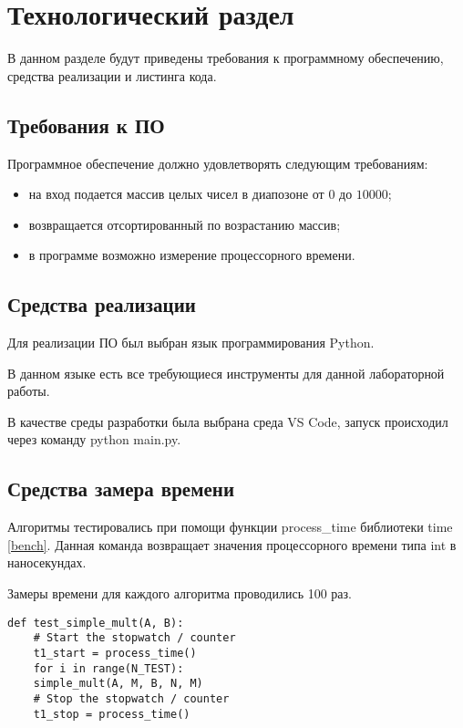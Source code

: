 \chapter{Технологический раздел}

В данном разделе будут приведены требования к программному обеспечению, средства реализации и листинга кода.

\section{Требования к ПО}

Программное обеспечение должно удовлетворять следующим требованиям:
\begin{itemize}
	\item на вход подается массив целых чисел в диапозоне от $0$ до $10000$;
	\item возвращается отсортированный по возрастанию массив;
	\item в программе возможно измерение процессорного времени.
\end{itemize}

\section{Средства реализации} 
Для реализации ПО был выбран язык программирования Python\cite{python}. 

В данном языке есть все требующиеся инструменты для данной лабораторной работы.

В качестве среды разработки была выбрана среда VS Code\cite{vscode}, запуск происходил через команду python main.py.

\section{Средства замера времени}

Алгоритмы тестировались при помощи функции process\_time библиотеки time \ref{bench}. Данная команда возвращает значения процессорного времени типа int в наносекундах.

Замеры времени для каждого алгоритма проводились 100 раз.
\newpage
\begin{lstlisting}[label=bench,caption=Пример теста эффективности]
	def test_simple_mult(A, B):
	# Start the stopwatch / counter 
	t1_start = process_time() 
	for i in range(N_TEST):
	simple_mult(A, M, B, N, M)
	# Stop the stopwatch / counter
	t1_stop = process_time()
\end{lstlisting}



